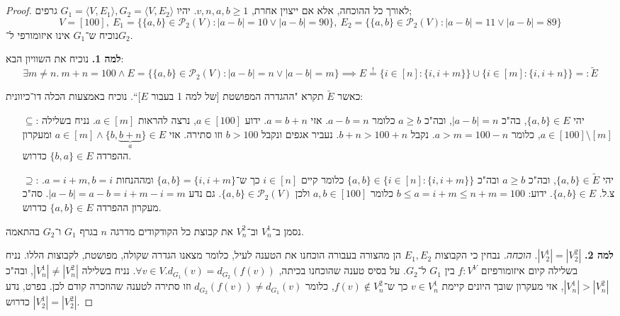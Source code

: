 \documentclass[]{article}
\newcommand\ps    {\mathcal{P}}
\newcommand\ra    {\rangle}
\newcommand\la    {\langle}
\newcommand\seq   {\overset{!}{=}}
\newcommand\tl    {\tilde}
\begin{document}
	\section{}
	\begin{proof}
		לאורך כל ההוכחה, אלא אם ייצוין אחרת, $v, n, a, b \ge 1$. 
		יהיו $G_1 = \la V, E_1 \ra, G_2 = \la V, E_2 \ra$ גרפים;
		\[ V = [100], \ E_1 = \{\{a, b\} \in \ps_2(V) \colon |a - b| = 10 \lor |a - b| = 90\}, \ E_2 = \{\{a, b\} \in \ps_2(V) \colon |a - b| = 11 \lor |a - b| = 89\} \]
		נוכיח ש־$G_1$ אינו איזומורפי ל־$G_2$. 
		
		\textbf{למה 1. }נוכיח את השוויון הבא: 
		\[ \exists m \neq n. \ m + n = 100 \land E = \{\{a, b\} \in \ps_2(V) \colon |a - b| = n \lor |a - b| = m\} \!\!\implies\!\! E \seq \{i \in [n] \colon \{i, i + m\}\} \cup \{i \in [m] \colon \{i, i + n\}\} =: \tl E \]
		
		כאשר $\tl E$ תקרא "ההגדרה המפושטת [של למה 1 בעבור $E$]``. 
		נוכיח באמצעות הכלה דו־כיוונית: 
		\begin{itemize}
			\item[$\subseteq$:] יהי $\{a, b\} \in E$, בה"כ $|a - b| = n$, ובה"כ $a \ge b$ כלומר $a - b = n$. אזי $a = b + n$. ידוע $a \in [100]$, נרצה להראות $a \in [m]$. נניח בשלילה $a \in [100] \setminus [m]$, כלומר $a > m = 100 - n$. נקבל $b + n > 100 + n$. נעביר אגפים ונקבל $b > 100$ וזו סתירה. אזי $a \in [m] \land \{b, \underbrace{b + n}_{a}\} \in E$ ומעקרון ההפרדה $\{b, a\} \in E$ כדרוש. 
			\item[$\supseteq$:] יהי $\{a, b\} \in \tl E$, ובה"כ $a \ge b$ ובה"כ $\{a, b\} \in \{i \in [n] \colon \{i, i + m\}\}$ כלומר קיים $i \in [n]$ כך ש־$\{a, b\} = \{i, i + m\}$ ומההנחות $a = i + m, b = i$. צ.ל. $\{a, b\} \in E$. ידוע: $b \le a = i + m \le n + m = 100$ כלומר $a, b \in [100]$ ולכן $\{a, b\} \in \ps_2(V)$. גם נדע $|a - b| = a - b = i + m - i = m$. סה"כ מעקרון ההפרדה $\{a, b\} \in E$ כדרוש. 
		\end{itemize}
		
		נסמן ב־$V_n^1$ וב־$V_n^2$ את קבוצת כל הקודקודים מדרגה $n$ בגרף $G_1$ ו־$G_2$ בהתאמה. 
		
		\textbf{למה 2. }$|V_2^1| = |V_2^2|$. \textit{הוכחה.}
		נבחין כי הקבוצות $E_1, E_2$ הן מהצורה בעבורה הוכחנו את הטענה לעיל, כלומר מצאנו הגדרה שקולה, מפושטת, לקבוצות הללו. נניח בשלילה קיום איזומורפיזם $f \colon V^V$ בין $G_1$ ל־$G_2$. על בסיס טענה שהוכחנו בכיתה, $\forall v \in V. d_{G_1}(v) = d_{G_2}(f(v))$. נניח בשלילה $|V_n^1| \neq |V_n^2|$, ובה"כ $|V_n^1| > |V_n^2|$, אזי מעקרון שובך היונים קיימת $v \in V_n^1$ כך ש־$f(v) \notin V_n^2$, כלומר $d_{G_2}(f(v)) \neq d_{G_1}(v)$ וזו סתירה לטענה שהוזכרה קודם לכן. בפרט, נדע $|V_2^1| = |V_2^2|$ כדרוש. 
		

\end{proof}
\end{document}
